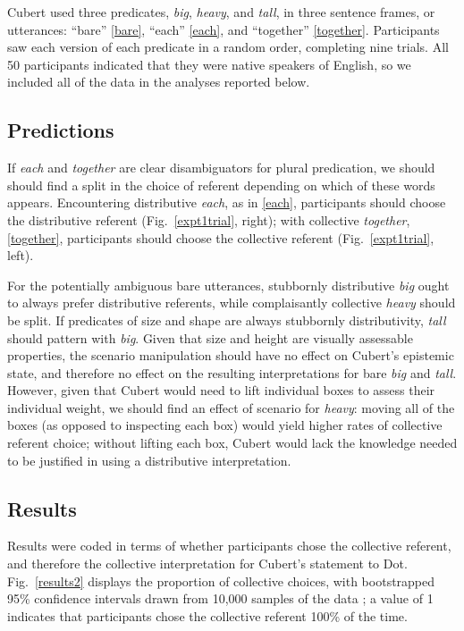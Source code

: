 \documentclass[linguex]{sp}
\begin{document}
 Cubert used three predicates, \emph{big}, \emph{heavy}, and \emph{tall}, in three sentence frames, or utterances: ``bare'' \ref{bare}, ``each'' \ref{each}, and ``together'' \ref{together}. Participants saw each version of each predicate in a random order, completing nine trials. All 50 participants indicated that they were native speakers of English, so we included all of the data in the analyses reported below.

\subsection{Predictions}

If \emph{each} and \emph{together} are clear disambiguators for plural predication, we should should find a split in the choice of referent depending on which of these words appears. Encountering distributive \emph{each}, as in \ref{each}, participants should choose the distributive referent (Fig.~\ref{expt1trial}, right); with collective \emph{together}, \ref{together}, participants should choose the collective referent (Fig.~\ref{expt1trial}, left). 

For the potentially ambiguous bare utterances, stubbornly distributive \emph{big} ought to always prefer distributive referents, while complaisantly collective \emph{heavy} should be split. If predicates of size and shape are always stubbornly distributivity, \emph{tall} should pattern with \emph{big}. Given that size and height are visually assessable properties, the scenario manipulation should have no effect on Cubert's epistemic state, and therefore no effect on the resulting interpretations for bare \emph{big} and \emph{tall}. 
However, given that Cubert would need to lift individual boxes to assess their individual weight, we should find an effect of scenario for \emph{heavy}: moving all of the boxes (as opposed to inspecting each box) would yield higher rates of collective referent choice; without lifting each box, Cubert would lack the knowledge needed to be justified in using a distributive interpretation.

\subsection{Results}

Results were coded in terms of whether participants chose the collective referent, and therefore the collective interpretation for Cubert's statement to Dot. Fig.\ \ref{results2} displays the proportion of collective choices, with bootstrapped 95\% confidence intervals drawn from 10,000 samples of the data \citep{diciccioefron1996}; a value of 1 indicates that participants chose the collective referent 100\% of the time.
\end{document}
